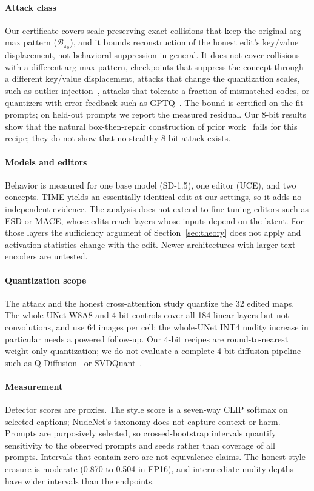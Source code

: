 \documentclass[conference]{IEEEtran}
\begin{document}
\paragraph{Attack class}
Our certificate covers scale-preserving exact collisions that keep the original
arg-max pattern ($\mathcal{B}_{\pi_0}$), and it bounds reconstruction of the honest
edit's key/value displacement, not behavioral suppression in general. It does not
cover collisions with a different arg-max pattern, checkpoints that suppress the
concept through a different key/value displacement, attacks that change the
quantization scales, such as outlier injection~\cite{zhan2026}, attacks that tolerate
a fraction of mismatched codes, or quantizers with error feedback such as
GPTQ~\cite{gptq}. The bound is certified on the fit prompts; on held-out prompts we
report the measured residual. Our 8-bit results show that the natural
box-then-repair construction of prior work~\cite{egashira2024,egashira2025} fails
for this recipe; they do not show that no stealthy 8-bit attack exists.

\paragraph{Models and editors}
Behavior is measured for one base model (SD-1.5), one editor (UCE), and two concepts.
TIME yields an essentially identical edit at our settings, so it adds no independent
evidence. The analysis does not extend to fine-tuning editors such as ESD or MACE,
whose edits reach layers whose inputs depend on the latent. For those layers the sufficiency argument of
Section~\ref{sec:theory} does not apply and activation statistics change with the
edit. Newer architectures with larger text encoders are untested.

\paragraph{Quantization scope}
The attack and the honest cross-attention study quantize the 32 edited maps. The
whole-UNet W8A8 and 4-bit controls cover all 184 linear layers but not convolutions,
and use 64 images per cell; the whole-UNet INT4 nudity increase in particular needs a
powered follow-up. Our 4-bit recipes are round-to-nearest weight-only quantization;
we do not evaluate a complete 4-bit diffusion pipeline such as
Q-Diffusion~\cite{qdiffusion} or SVDQuant~\cite{svdquant}.

\paragraph{Measurement}
Detector scores are proxies. The style score is a seven-way CLIP softmax on selected
captions; NudeNet's taxonomy does not capture context or harm. Prompts are purposively
selected, so crossed-bootstrap intervals quantify sensitivity to the observed prompts
and seeds rather than coverage of all prompts. Intervals that contain zero are not
equivalence claims. The honest style erasure is moderate (0.870 to 0.504 in FP16), and
intermediate nudity depths have wider intervals than the endpoints.
\end{document}
